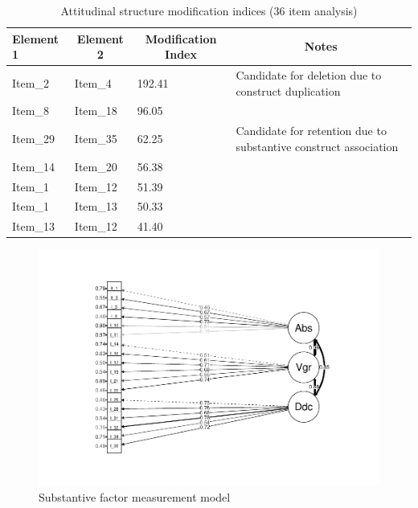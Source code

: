 \documentclass[
  english,
  man]{apa7}
\begin{document}
\begin{table}[tbp]

\begin{center}
\begin{threeparttable}

\caption{\label{tab:modindices}Attitudinal structure modification indices (36 item analysis)}

\begin{tabular}{llll}
\toprule
Element 1 & \multicolumn{1}{c}{Element 2} & \multicolumn{1}{c}{Modification Index} & \multicolumn{1}{c}{Notes}\\
\midrule
Item\_2 & Item\_4 & 192.41 & Candidate for deletion due to construct duplication\\
Item\_8 & Item\_18 & 96.05 & \\
Item\_29 & Item\_35 & 62.25 & Candidate for retention due to substantive construct association\\
Item\_14 & Item\_20 & 56.38 & \\
Item\_1 & Item\_12 & 51.39 & \\
Item\_1 & Item\_13 & 50.33 & \\
Item\_13 & Item\_12 & 41.40 & \\
\bottomrule
\end{tabular}

\end{threeparttable}
\end{center}

\end{table}

\begin{figure}
\centering
\includegraphics{SIOPpapaja_files/figure-latex/CFAatt1-1.pdf}
\caption{\label{fig:CFAatt1}Substantive factor measurement model}
\end{figure}
\end{document}
